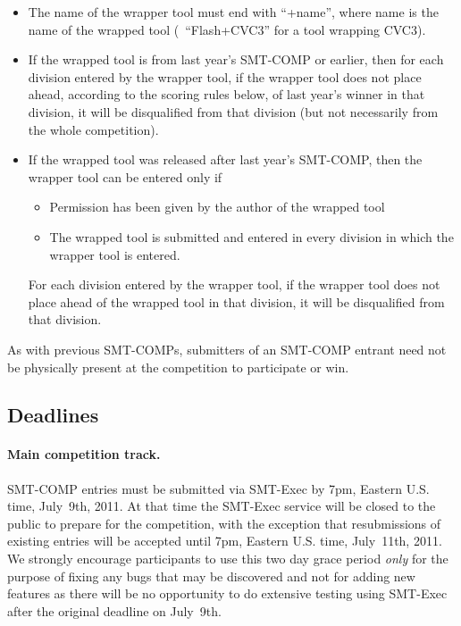 \documentclass[12pt]{article}
\begin{document}
\begin{itemize}
\item The name of the wrapper tool must end with ``+name'', where name
is the name of the wrapped tool (\eg\ ``Flash+CVC3'' for a tool
wrapping CVC3).

\item If the wrapped tool is from last year's SMT-COMP or earlier, then for
each division entered by the wrapper tool, if the wrapper tool does not place ahead, according to the scoring
rules below, of last year's winner in that division, it will be disqualified
from that division (but not necessarily from the whole competition).

\item If the wrapped tool was released after last year's SMT-COMP,
then the wrapper tool can be entered only if

\begin{itemize}
\item Permission has been given by the author of the wrapped tool

\item The wrapped tool is submitted and entered in every division
      in which the wrapper tool is entered.
\end{itemize}

For each division entered by the wrapper tool, if the wrapper tool
does not place ahead of the wrapped tool in that division, it will be
disqualified from that division.
\end{itemize}

As with previous SMT-COMPs, submitters of an SMT-COMP entrant need not 
be physically present at the competition to
participate or win.

\subsection*{Deadlines} %

\paragraph{Main competition track.} %
SMT-COMP entries must be submitted via SMT-Exec by 7pm, Eastern U.S.
time, July~9th, 2011.  At that time the SMT-Exec service will be
closed to the public to prepare for the competition, with the
exception that resubmissions of existing entries will be accepted
until 7pm, Eastern U.S. time, July~11th, 2011.  We strongly encourage
participants to use this two day grace period \emph{only} for the
purpose of fixing any bugs that may be discovered and not for adding
new features as there will be no opportunity to do extensive testing
using SMT-Exec after the original deadline on July~9th.
\end{document}
